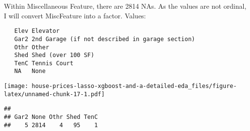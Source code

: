 \documentclass[]{article}
\newenvironment{Shaded}{\begin{snugshade}}{\end{snugshade}}
\newcommand{\KeywordTok}[1]{\textcolor[rgb]{0.13,0.29,0.53}{\textbf{#1}}}
\newcommand{\DataTypeTok}[1]{\textcolor[rgb]{0.13,0.29,0.53}{#1}}
\newcommand{\DecValTok}[1]{\textcolor[rgb]{0.00,0.00,0.81}{#1}}
\newcommand{\StringTok}[1]{\textcolor[rgb]{0.31,0.60,0.02}{#1}}
\newcommand{\OperatorTok}[1]{\textcolor[rgb]{0.81,0.36,0.00}{\textbf{#1}}}
\newcommand{\NormalTok}[1]{#1}
\begin{document}
Within Miscellaneous Feature, there are 2814 NAs. As the values are not
ordinal, I will convert MiscFeature into a factor. Values:

\begin{verbatim}
   Elev Elevator
   Gar2 2nd Garage (if not described in garage section)
   Othr Other
   Shed Shed (over 100 SF)
   TenC Tennis Court
   NA   None
\end{verbatim}

\begin{Shaded}
\end{Shaded}

\texttt{[image: house-prices-lasso-xgboost-and-a-detailed-eda\_files/figure-latex/unnamed-chunk-17-1.pdf]}

\begin{Shaded}
\end{Shaded}

\begin{verbatim}
## 
## Gar2 None Othr Shed TenC 
##    5 2814    4   95    1
\end{verbatim}
\end{document}
